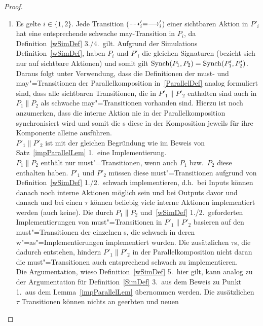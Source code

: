 \begin{proof}\mbox{}
  \begin{enumerate}
    \item Es gelte $i\in\{1,2\}$. Jede Transition ($\may '_i =\must '_i$) einer
      sichtbaren Aktion in $P'_i$ hat eine entsprechende schwache
      may-Transition in $P_i$, da Definition~\ref{wSimDef} 3./4.\ gilt. Aufgrund
      der Simulations Definition~\ref{wSimDef}, haben $P_i$ und $P'_i$ die
      gleichen Signaturen (bezieht sich nur auf sichtbare Aktionen) und somit
      gilt $\mathrm{Synch} (P_1,P_2) = \mathrm{Synch} (P'_1,P'_2)$.\\
      Daraus folgt unter Verwendung, dass die Definitionen der must- und
      may"=Transitionen der Parallelkomposition in~\ref{ParallelDef} analog
      formuliert sind, dass alle sichtbaren Transitionen, die in $P'_1\|P'_2$
      enthalten sind auch in $P_1\|P_2$ als schwache may"=Transitionen
      vorhanden sind. Hierzu ist noch anzumerken, dass die interne Aktion nie
      in der Parallelkomposition synchronisiert wird und somit die \MEIO{}s
      diese in der Komposition jeweils für ihre Komponente alleine ausführen.\\
      $P'_1\|P'_2$ ist mit der gleichen Begründung wie im Beweis von
      Satz~\ref{impParallelLem} 1.\ eine Implementierung.\\
      $P_1\|P_2$ enthält nur must"=Transitionen, wenn auch $P_1$ bzw.\ $P_2$
      diese enthalten haben. $P'_1$ und $P'_2$ müssen diese must"=Transitionen
      aufgrund von Definition~\ref{wSimDef} 1./2.\ schwach implementieren, d.h.\
      bei Inputs können danach noch interne Aktionen möglich sein und bei
      Outputs davor und danach und bei einen $\tau$ können beliebig viele
      interne Aktionen implementiert werden (auch keine). Die durch $P_1\|P_2$
      und~\ref{wSimDef} 1./2.\ geforderten Implementierungen von must"=Transitionen
      in $P'_1\|P'_2$ basieren auf den must"=Transitionen der einzelnen
      \MEIO{}s, die schwach in deren w"=as"=Implementierungen implementiert
      wurden. Die zusätzlichen $\tau$s, die dadurch entstehen, hindern
      $P'_1\|P'_2$ in der Parallelkomposition nicht daran die
      must"=Transitionen auch entsprechend schwach zu implementieren.\\
      Die Argumentation, wieso Definition~\ref{wSimDef} 5.\ hier gilt, kann
      analog zu der Argumentation für Definition~\ref{SimDef} 3.\ aus dem
      Beweis zu Punkt 1.\ aus dem Lemma~\ref{impParallelLem} übernommen werden.
      Die zusätzlichen $\tau$ Transitionen können nichts an geerbten und neuen

\end{enumerate}
\end{proof}
